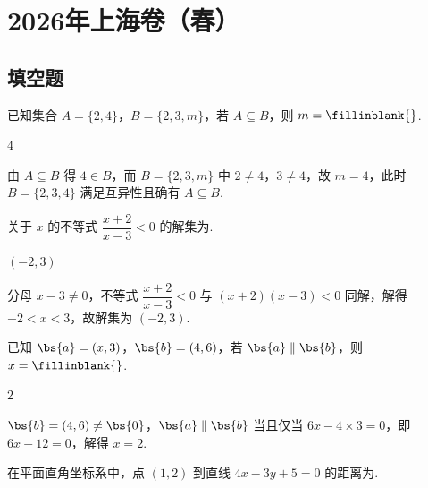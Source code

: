 \chapter{2026年上海卷（春）}

\section{填空题}

\begin{problem}
已知集合 \(A=\{2,4\}\)，\(B=\{2,3,m\}\)，若 \(A\subseteq B\)，则 \(m=\fillinblank{}\).
\end{problem}

\begin{answer}
\(4\)
\end{answer}

\begin{solution}
由 \(A\subseteq B\) 得 \(4\in B\)，而 \(B=\{2,3,m\}\) 中 \(2\ne4\)，\(3\ne4\)，故 \(m=4\)，此时 \(B=\{2,3,4\}\) 满足互异性且确有 \(A\subseteq B\).
\end{solution}

\begin{problem}
关于 \(x\) 的不等式 \(\dfrac{x+2}{x-3}<0\) 的解集为\fillinblank{}.
\end{problem}

\begin{answer}
\((-2,3)\)
\end{answer}

\begin{solution}
分母 \(x-3\ne0\)，不等式 \(\dfrac{x+2}{x-3}<0\) 与 \((x+2)(x-3)<0\) 同解，解得 \(-2<x<3\)，故解集为 \((-2,3)\).
\end{solution}

\begin{problem}
已知 \(\bs{a}=(x,3)\)，\(\bs{b}=(4,6)\)，若 \(\bs{a}\parallel\bs{b}\)，则 \(x=\fillinblank{}\).
\end{problem}

\begin{answer}
\(2\)
\end{answer}

\begin{solution}
\(\bs{b}=(4,6)\ne\bs{0}\)，\(\bs{a}\parallel\bs{b}\) 当且仅当 \(6x-4\times3=0\)，即 \(6x-12=0\)，解得 \(x=2\).
\end{solution}

\begin{problem}
在平面直角坐标系中，点 \((1,2)\) 到直线 \(4x-3y+5=0\) 的距离为\fillinblank{}.
\end{problem}

